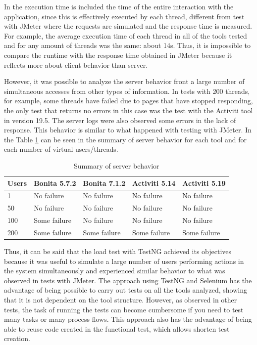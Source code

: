 \documentclass[runningheads,a4paper]{llncs}
\begin{document}
In the execution time is included the time of the entire interaction with the application, since this is effectively executed by each thread, different from test with JMeter where the requests are simulated and the response time is measured. For example, the average execution time of each thread in all of the tools tested and for any amount of threads was the same: about 14s. Thus, it is impossible to compare the runtime with the response time obtained in JMeter because it reflects more about client behavior than server.

However, it was possible to analyze the server behavior front a large number of simultaneous accesses from other types of information. In tests with 200 threads, for example, some threads have failed due to pages that have stopped responding, the only test that returns no errors in this case was the test with the Activiti tool in version 19.5. The server logs were also observed some errors in the lack of response. This behavior is similar to what happened with testing with JMeter. In the Table \ref{tab:resultadoCargaSelenium} can be seen in the summary of server behavior for each tool and for each number of virtual users/threads.

\begin{table}
\centering
\begin{tabular}{p{2cm}|p{2cm}|p{2cm}|p{2cm}|p{2cm}}
\hline
Users & Bonita 5.7.2 & Bonita 7.1.2 & Activiti 5.14 & Activiti 5.19 \\\hline
1 & No failure & No failure & No failure & No failure \\\hline
50 & No failure & No failure & No failure & No failure \\\hline
100 & Some failure & No failure & No failure & No failure \\\hline
200 & Some failure & Some failure & Some failure & Some failure \\\hline
\end{tabular}
\caption{Summary of server behavior}
\label{tab:resultadoCargaSelenium}
\end{table}

Thus, it can be said that the load test with TestNG achieved its objectives because it was useful to simulate a large number of users performing actions in the system simultaneously and experienced similar behavior to what was observed in tests with JMeter. The approach using TestNG and Selenium has the advantage of being possible to carry out tests on all the tools analyzed, showing that it is not dependent on the tool structure. However, as observed in other tests, the task of running the tests can become cumbersome if you need to test many tasks or many process flows. This approach also has the advantage of being able to reuse code created in the functional test, which allows shorten test creation.
\end{document}
